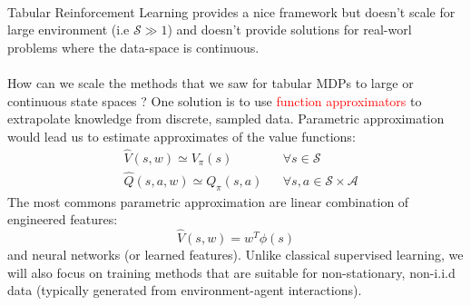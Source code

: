 \documentclass[a4paper]{article}
\begin{document}
    

	\paragraph{} Tabular Reinforcement Learning provides a nice framework but doesn't scale for large environment (i.e $\mathcal{S}\gg1$) and doesn't provide solutions for real-worl problems where the data-space is continuous. 
	
	\paragraph{} How can we scale the methods that we saw for tabular MDPs to large or continuous state spaces ? One solution is to use \textcolor{red}{function approximators} to extrapolate knowledge from discrete, sampled data. Parametric approximation would lead us to estimate approximates of the value functions: 
	\begin{equation}
		\begin{aligned}
			&\hat{V}(s,w) \simeq V_\pi(s) & &\forall s \in\mathcal{S}\\
			&\hat{Q}(s,a,w) \simeq Q_\pi(s,a) & &\forall s,a \in\mathcal{S}\times\mathcal{A}
		\end{aligned}
	\end{equation}
	The most commons parametric approximation are linear combination of engineered features:
	\begin{equation}
		\hat{V}(s,w) = w^T\phi(s)
	\end{equation} 
	and neural networks (or learned features). Unlike classical supervised learning, we will also focus on training methods that are suitable for non-stationary, non-i.i.d data (typically generated from environment-agent interactions). 
	
\end{document}
